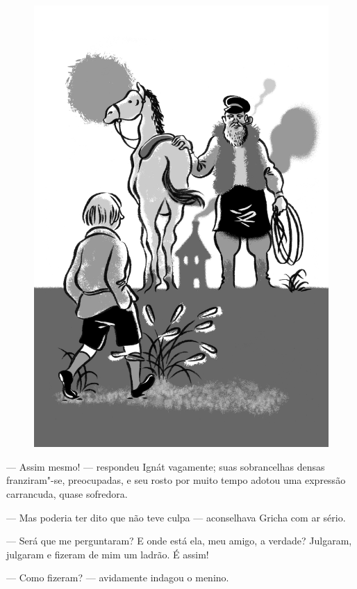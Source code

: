\begin{figure}%
\vspace*{-2.275cm}
\hspace*{-2.75cm}\includegraphics{./imgs/cena9.jpg}
\end{figure}


--- Assim mesmo! --- respondeu Ignát vagamente; suas sobrancelhas densas
franziram"-se, preocupadas, e seu rosto por muito tempo adotou uma
expressão carrancuda, quase sofredora.

--- Mas poderia ter dito que não teve culpa --- aconselhava Gricha com
ar sério.

--- Será que me perguntaram? E onde está ela, meu amigo, a verdade?
Julgaram, julgaram e fizeram de mim um ladrão. É assim!

--- Como fizeram? --- avidamente indagou o menino.

